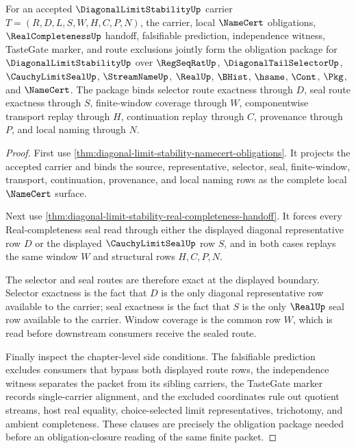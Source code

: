 \begin{theorem}
\label{thm:diagonal-limit-stability-obligation-package}
For an accepted $\DiagonalLimitStabilityUp$ carrier $T=(R,D,L,S,W,H,C,P,N)$, the carrier, local $\NameCert$ obligations, $\RealCompletenessUp$ handoff, falsifiable prediction, independence witness, TasteGate marker, and route exclusions jointly form the obligation package for $\DiagonalLimitStabilityUp$ over $\RegSeqRatUp$, $\DiagonalTailSelectorUp$, $\CauchyLimitSealUp$, $\StreamNameUp$, $\RealUp$, $\BHist$, $\hsame$, $\Cont$, $\Pkg$, and $\NameCert$. The package binds selector route exactness through $D$, seal route exactness through $S$, finite-window coverage through $W$, componentwise transport replay through $H$, continuation replay through $C$, provenance through $P$, and local naming through $N$.
\end{theorem}
\begin{proof}
First use \autoref{thm:diagonal-limit-stability-namecert-obligations}. It projects the accepted carrier and binds the source, representative, selector, seal, finite-window, transport, continuation, provenance, and local naming rows as the complete local $\NameCert$ surface.

Next use \autoref{thm:diagonal-limit-stability-real-completeness-handoff}. It forces every Real-completeness seal read through either the displayed diagonal representative row $D$ or the displayed $\CauchyLimitSealUp$ row $S$, and in both cases replays the same window $W$ and structural rows $H,C,P,N$.

The selector and seal routes are therefore exact at the displayed boundary. Selector exactness is the fact that $D$ is the only diagonal representative row available to the carrier; seal exactness is the fact that $S$ is the only $\RealUp$ seal row available to the carrier. Window coverage is the common row $W$, which is read before downstream consumers receive the sealed route.

Finally inspect the chapter-level side conditions. The falsifiable prediction excludes consumers that bypass both displayed route rows, the independence witness separates the packet from its sibling carriers, the TasteGate marker records single-carrier alignment, and the excluded coordinates rule out quotient streams, host real equality, choice-selected limit representatives, trichotomy, and ambient completeness. These clauses are precisely the obligation package needed before an obligation-closure reading of the same finite packet.
\end{proof}

